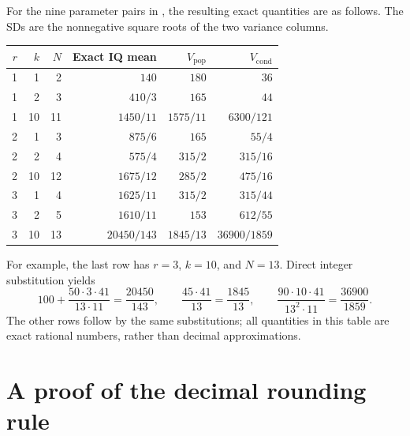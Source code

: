 For the nine parameter pairs in , the
resulting exact quantities are as follows. The SDs are the nonnegative
square roots of the two variance columns.

\begin{center}
\begin{tabular}{rrr r r r}
\hline
\(r\) & \(k\) & \(N\) & Exact IQ mean & \(V_{\mathrm{pop}}\) &
\(V_{\mathrm{cond}}\) \\
\hline
1 & 1  & 2  & \(140\) & \(180\) & \(36\) \\
1 & 2  & 3  & \(410/3\) & \(165\) & \(44\) \\
1 & 10 & 11 & \(1450/11\) & \(1575/11\) & \(6300/121\) \\
\hline
2 & 1  & 3  & \(875/6\) & \(165\) & \(55/4\) \\
2 & 2  & 4  & \(575/4\) & \(315/2\) & \(315/16\) \\
2 & 10 & 12 & \(1675/12\) & \(285/2\) & \(475/16\) \\
\hline
3 & 1  & 4  & \(1625/11\) & \(315/2\) & \(315/44\) \\
3 & 2  & 5  & \(1610/11\) & \(153\) & \(612/55\) \\
3 & 10 & 13 & \(20450/143\) & \(1845/13\) & \(36900/1859\) \\
\hline
\end{tabular}
\end{center}

For example, the last row has \(r=3\), \(k=10\), and \(N=13\). Direct
integer substitution yields
\[
 100+\frac{50\cdot3\cdot41}{13\cdot11}
    =\frac{20450}{143},\qquad
 \frac{45\cdot41}{13}=\frac{1845}{13},\qquad
 \frac{90\cdot10\cdot41}{13^2\cdot11}
    =\frac{36900}{1859}.
\]
The other rows follow by the same substitutions; all quantities in this
table are exact rational numbers, rather than decimal approximations.

\section{A proof of the decimal rounding rule}

